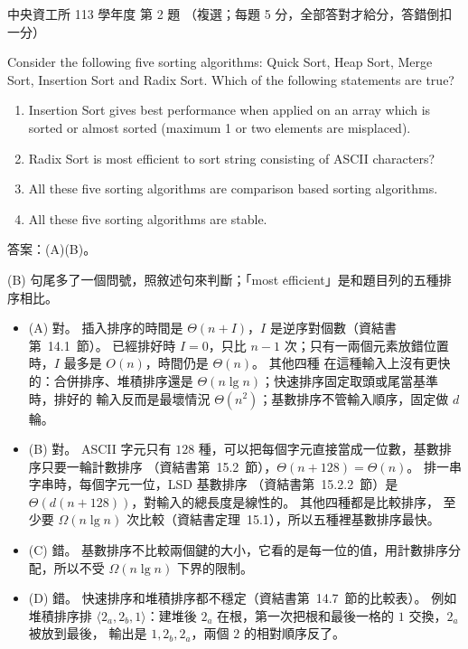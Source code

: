 \begin{pastexam}[label={px:ncu-113-dsa-02}]{中央資工所 113 學年度 第 2 題}
（複選；每題 5 分，全部答對才給分，答錯倒扣一分）

Consider the following five sorting algorithms: Quick Sort, Heap Sort, Merge Sort, Insertion Sort and Radix
Sort. Which of the following statements are true?
\begin{enumerate}[label=(\Alph*)]
\item Insertion Sort gives best performance when applied on an array which is sorted or almost sorted
(maximum 1 or two elements are misplaced).
\item Radix Sort is most efficient to sort string consisting of ASCII characters?
\item All these five sorting algorithms are comparison based sorting algorithms.
\item All these five sorting algorithms are stable.
\end{enumerate}
\end{pastexam}

\begin{pastsoln}
答案：(A)(B)。

(B) 句尾多了一個問號，照敘述句來判斷；「most efficient」是和題目列的五種排序相比。

\begin{itemize}
\item (A) 對。 插入排序的時間是 $\Theta(n + I)$，$I$ 是逆序對個數（資結書第~14.1~節）。 已經排好時
$I = 0$，只比 $n - 1$ 次；只有一兩個元素放錯位置時，$I$ 最多是 $O(n)$，時間仍是 $\Theta(n)$。 其他四種
在這種輸入上沒有更快的：合併排序、堆積排序還是 $\Theta(n\lg n)$；快速排序固定取頭或尾當基準時，排好的
輸入反而是最壞情況 $\Theta(n^2)$；基數排序不管輸入順序，固定做 $d$ 輪。
\item (B) 對。 ASCII 字元只有 $128$ 種，可以把每個字元直接當成一位數，基數排序只要一輪計數排序
（資結書第~15.2~節），$\Theta(n + 128) = \Theta(n)$。 排一串字串時，每個字元一位，LSD 基數排序
（資結書第~15.2.2~節）是 $\Theta(d(n + 128))$，對輸入的總長度是線性的。 其他四種都是比較排序，
至少要 $\Omega(n\lg n)$ 次比較（資結書定理~15.1），所以五種裡基數排序最快。
\item (C) 錯。 基數排序不比較兩個鍵的大小，它看的是每一位的值，用計數排序分配，所以不受
$\Omega(n\lg n)$ 下界的限制。
\item (D) 錯。 快速排序和堆積排序都不穩定（資結書第~14.7~節的比較表）。 例如堆積排序排
$\langle 2_a, 2_b, 1\rangle$：建堆後 $2_a$ 在根，第一次把根和最後一格的 $1$ 交換，$2_a$ 被放到最後，
輸出是 $1, 2_b, 2_a$，兩個 $2$ 的相對順序反了。
\end{itemize}
\end{pastsoln}
